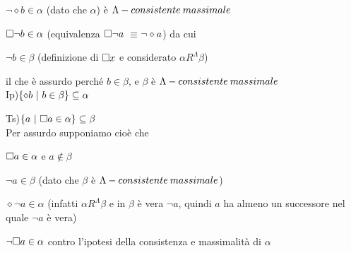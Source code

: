 %
$\neg\diamond b\in\alpha$\foreignlanguage{italian}{ (dato che $\alpha$)
è $\Lambda-consistente\: massimale$}

%
$\square\neg b\in\alpha$ (equivalenza $\square\neg a$ $\equiv$$\neg\diamond a$)
da cui

$\neg b\in\beta$ (definizione di $\square x$ e considerato $\alpha R^{\Lambda}\beta$)

il che è assurdo perché $b\in\beta$, e $\beta$ è $\Lambda-consistente\: massimale$\lightning\\


Ip)$\{\diamond b\ |\ b\in\beta\}\subseteq\alpha$

Ts)$\{a\ |\ \square a\in\alpha\}\subseteq\beta$\\
 Per assurdo supponiamo cioè che

$\square a\in\alpha$ e $a\notin\beta$

$\neg a\in\beta$ (dato che $\beta$ è $\Lambda-consistente\: massimale$)

$\diamond\neg a\in\alpha$ (infatti $\alpha R^{\Lambda}\beta$ e in
$\beta$ è vera $\neg a$, quindi $a$ ha almeno un successore nel
quale $\neg a$ è vera)

$\neg\square a\in\alpha$ contro l'ipotesi della consistenza e massimalità
di $\alpha$\lightning\\

